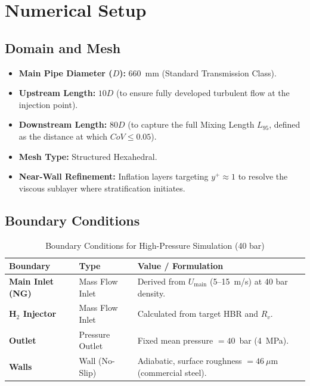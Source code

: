 \documentclass[12pt, a4paper]{report}
\begin{document}
\section{Numerical Setup}

\subsection{Domain and Mesh}
\begin{itemize}
    \item \textbf{Main Pipe Diameter ($D$):} 660~mm (Standard Transmission Class).
    \item \textbf{Upstream Length:} $10D$ (to ensure fully developed turbulent flow at the injection point).
    \item \textbf{Downstream Length:} $80D$ (to capture the full Mixing Length $L_{95}$, defined as the distance at which $CoV \leq 0.05$).
    \item \textbf{Mesh Type:} Structured Hexahedral.
    \item \textbf{Near-Wall Refinement:} Inflation layers targeting $y^+ \approx 1$ to resolve the viscous sublayer where stratification initiates.
\end{itemize}

\subsection{Boundary Conditions}
\begin{table}[H]
\centering
\caption{Boundary Conditions for High-Pressure Simulation (40 bar)}
\label{tab:bc}
\begin{tabular}{@{}lll@{}}
\toprule
\textbf{Boundary} & \textbf{Type} & \textbf{Value / Formulation} \\ \midrule
\textbf{Main Inlet (NG)} & Mass Flow Inlet & Derived from $U_{\text{main}}$ (5--15~m/s) at 40 bar density. \\
\textbf{H$_2$ Injector} & Mass Flow Inlet & Calculated from target HBR and $R_v$. \\
\textbf{Outlet} & Pressure Outlet & Fixed mean pressure $= 40$~bar (4~MPa). \\
\textbf{Walls} & Wall (No-Slip) & Adiabatic, surface roughness $= 46~\mu$m (commercial steel). \\ \bottomrule
\end{tabular}
\end{table}

\end{document}
